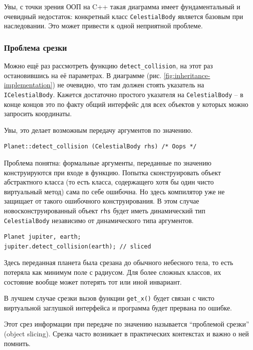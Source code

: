 \documentclass[a4paper,12pt,oneside]{article}
\begin{document}
Увы, с точки зрения ООП на C++ такая диаграмма имеет фундаментальный и очевидный недостаток: конкретный класс \lstinline!CelestialBody! является базовым при наследовании. Это может привести к одной неприятной проблеме.

\subsubsection{Проблема срезки}\label{Cutting}

Можно ещё раз рассмотреть функцию \lstinline!detect_collision!, на этот раз остановившись на её параметрах. В диаграмме (рис. \ref{fig:inheritance-implementation}) не очевидно, что там должен стоять указатель на \lstinline!ICelestialBody!. Кажется достаточно простого указателя на \lstinline!CelestialBody! -- в конце концов это по факту общий интерфейс для всех объектов у которых можно запросить координаты.

Увы, это делает возможным передачу аргументов по значению.

\begin{lstlisting}
Planet::detect_collision (CelestialBody rhs) /* Oops */
\end{lstlisting}

Проблема понятна: формальные аргументы, переданные по значению конструируются при входе в функцию. Попытка сконструировать объект абстрактного класса (то есть класса, содержащего хотя бы один чисто виртуальный метод) сама по себе ошибочна. Но здесь компилятор уже не защищает от такого ошибочного конструирования. В этом случае новосконструированный объект \lstinline!rhs! будет иметь динамический тип \lstinline!CelestialBody! независимо от динамического типа аргументов. 

\begin{lstlisting}
Planet jupiter, earth;
jupiter.detect_collision(earth); // sliced
\end{lstlisting}

Здесь переданная планета была срезана до обычного небесного тела, то есть потеряла как минимум поле с радиусом. Для более сложных классов, их состояние вообще может потерять тот или иной инвариант.

В лучшем случае срезки вызов функции \lstinline!get_x()! будет связан с чисто виртуальной заглушкой интерфейса и программа будет прервана по ошибке. 

Этот срез информации при передаче по значению называется ``проблемой срезки'' (object slicing). Срезка часто возникает в практических контекстах и важно о ней помнить.
\end{document}
